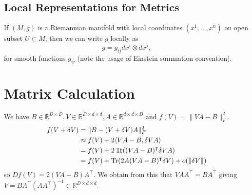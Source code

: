 \documentclass[11pt]{scrartcl}
\newcommand{\R}{\mathbb{R}}
\newcommand{\T}{\mathbb T}
\newcommand{\<}{\langle}
\renewcommand{\>}{\rangle}
\let \tensor \otimes
\newcommand{\1}{\textbf{1}} %
\begin{document}
\subsection{Local Representations for Metrics}
If $(M, g)$ is a Riemannian manifold with local coordinates $(x^1, \dots, x^n)$ on open subset $U \subset M$, then we can write $g$ locally as 
$$g = g_{ij} dx^i \tensor dx^j,$$
for smooth functions $g_{ij}$ (note the usage of Einstein summation convention).
\pagebreak
\let \T \intercal
\section{Matrix Calculation}
 We have $B \in \R^{D \times D}, V \in \R^{D \times d \times d}, A \in \R^{d \times d \times D}$ and $ f(V) = \|VA - B\|_F^2$.
\begin{align*}
f(V + \delta V) &= \|B - (V + \delta V)A\|_F^2 \\
&\approx  f(V) + 2\<VA - B, \delta V A\> \\
&= f(V) + 2 \Tr((VA - B)^\T \delta V A)\\
&= f(V) + \Tr(2A(VA - B)^\T \delta V ) + o(\|\delta V \|)\\
\end{align*}
so $Df(V) = 2(VA - B) A^\T$.  We obtain from this that $VAA^\T = BA^\T$ giving $V = BA^\T(AA^\T)^{-1} \in \R^{D \times d \times d}$.

\pagebreak
\renewcommand{\listtheoremname}{List of Definitions and Theorems}
\listoftheorems[ignoreall,show={theorem,definition}]
\end{document}
